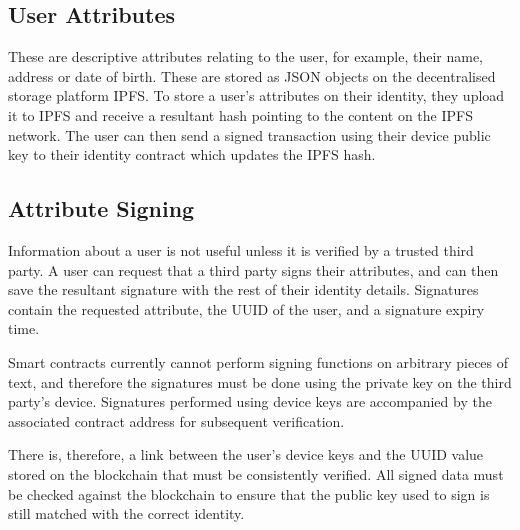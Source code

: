 \subsection{User Attributes}
These are descriptive attributes relating to the user, for example, their name, address or date of birth. These are stored as \ac{JSON} objects on the decentralised storage platform \ac{IPFS}. To store a user's attributes on their identity, they upload it to \ac{IPFS} and receive a resultant hash pointing to the content on the \ac{IPFS} network. The user can then send a signed transaction using their device public key to their identity contract which updates the \ac{IPFS} hash.

\subsection{Attribute Signing}
Information about a user is not useful unless it is verified by a trusted third party. A user can request that a third party signs their attributes, and can then save the resultant signature with the rest of their identity details. Signatures contain the requested attribute, the \ac{UUID} of the user, and a signature expiry time. 

Smart contracts currently cannot perform signing functions on arbitrary pieces of text, and therefore the signatures must be done using the private key on the third party's device. Signatures performed using device keys are accompanied by the associated contract address for subsequent verification.

There is, therefore, a link between the user's device keys and the \ac{UUID} value stored on the blockchain that must be consistently verified. All signed data must be checked against the blockchain to ensure that the public key used to sign is still matched with the correct identity.

